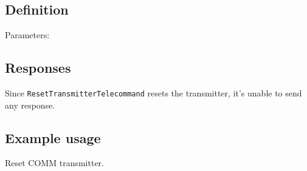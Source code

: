 \subsection{Definition}

Parameters: 

\None

\subsection{Responses}

Since \texttt{ResetTransmitterTelecommand} resets the transmitter, it's unable to send any response. 

\subsection{Example usage}
Reset COMM transmitter.

